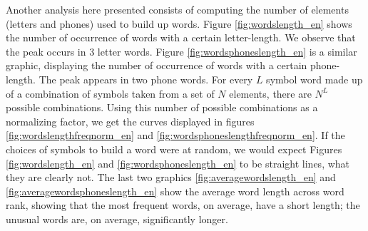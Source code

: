 Another analysis here presented consists of computing the number of elements (letters and phones) 
used to build up words. Figure \ref{fig:wordslength_en} shows the number of occurrence of words 
with a certain letter-length. We observe that the peak occurs in 3 letter words. 
Figure \ref{fig:wordsphoneslength_en} is a similar graphic, displaying the number of occurrence 
of words with a certain phone-length. The peak appears in two phone words. For every $L$ symbol 
word made up of a combination of symbols taken from a set of $N$ elements, there are $N^L$ possible 
combinations. Using this number of possible combinations as a normalizing factor, we get the curves 
displayed in figures \ref{fig:wordslengthfreqnorm_en} and \ref{fig:wordsphoneslengthfreqnorm_en}. 
If the choices of symbols to build a word were at random, we would expect Figures \ref{fig:wordslength_en} 
and \ref{fig:wordsphoneslength_en} to be straight lines, what they are clearly not. 
The last two graphics \ref{fig:averagewordslength_en} and \ref{fig:averagewordsphoneslength_en} 
show the average word length across word rank, showing that the most frequent words, on average, 
have a short length; the unusual words are, on average, significantly longer.



